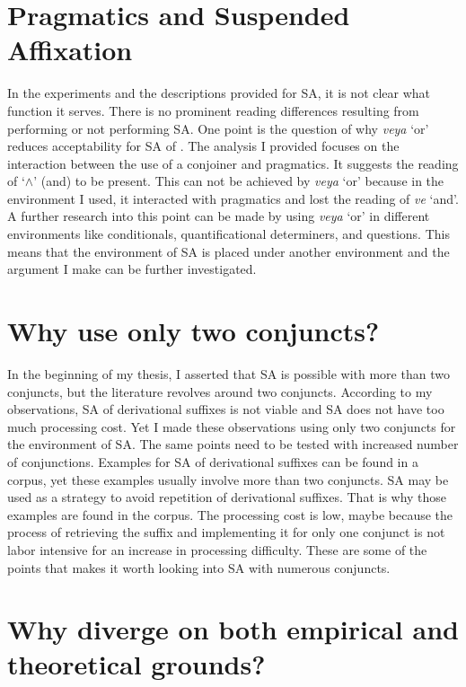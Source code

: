 \section{Pragmatics and Suspended Affixation}

In the experiments and the descriptions provided for SA, it is not clear what function it serves. There is no prominent reading differences resulting from performing or not performing SA. One point is the question of why \textit{veya} `or' reduces acceptability for SA of {\Acc}. The analysis I provided focuses on the interaction between the use of a conjoiner and pragmatics. It suggests the reading of `$\wedge$' (and) to be present. This can not be achieved by \textit{veya} `or' because in the environment I used, it interacted with pragmatics and lost the reading of \textit{ve} `and'. A further research into this point can be made by using \textit{veya} `or' in different environments like conditionals, quantificational determiners, and questions. This means that the environment of SA is placed under another environment and the argument I make can be further investigated.

\section{Why use only two conjuncts?}

In the beginning of my thesis, I asserted that SA is possible with more than two conjuncts, but the literature revolves around two conjuncts. According to my observations, SA of derivational suffixes is not viable and SA does not have too much processing cost. Yet I made these observations using only two conjuncts for the environment of SA. The same points need to be tested with increased number of conjunctions. Examples for SA of derivational suffixes can be found in a corpus, yet these examples usually involve more than two conjuncts. SA may be used as a strategy to avoid repetition of derivational suffixes. That is why those examples are found in the corpus. The processing cost is low, maybe because the process of retrieving the suffix and implementing it for only one conjunct is not labor intensive for an increase in processing difficulty. These are some of the points that makes it worth looking into SA with numerous conjuncts.


\section{Why diverge on both empirical and theoretical grounds?}

